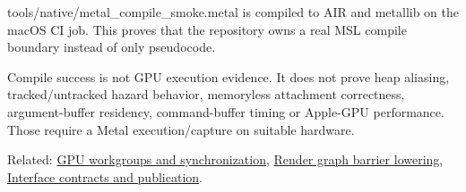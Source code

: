 \hypertarget{appendix-563b2cb23fc3-current-evidence}{}

tools/native/metal\_compile\_smoke.metal is compiled to AIR and metallib on the macOS CI job. This proves that the repository owns a real MSL compile boundary instead of only pseudocode.

Compile success is not GPU execution evidence. It does not prove heap aliasing, tracked/untracked hazard behavior, memoryless attachment correctness, argument-buffer residency, command-buffer timing or Apple-GPU performance. Those require a Metal execution/capture on suitable hardware.

Related: \hyperref[appendix-f662b5b1773b]{GPU workgroups and synchronization}, \hyperref[appendix-0fc95374cb7e]{Render graph barrier lowering}, \hyperref[appendix-fdae7ff0a23f]{Interface contracts and publication}.
